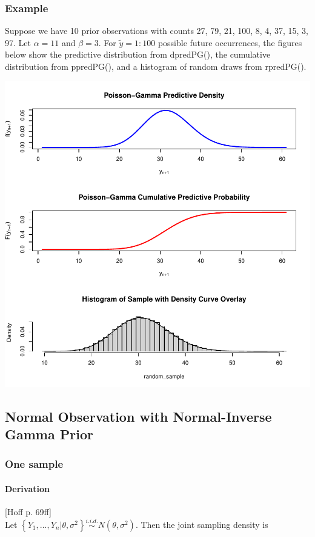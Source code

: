 \documentclass[12pt, a4paper]{article}
\begin{document}
    \subsubsection{Example}

Suppose we have 10 prior observations with counts 27, 79, 21, 100, 8, 4, 37, 15, 3, 97.  Let $\alpha = 11$ and $\beta = 3$.  For $\tilde{y} = 1:100$ possible future occurrences, the figures below show the predictive distribution from dpredPG(), the cumulative distribution from ppredPG(), and a histogram of random draws from rpredPG().

\includegraphics{Thesis-004}

\clearpage

  \subsection{Normal Observation with Normal-Inverse Gamma Prior}
    \subsubsection{One sample}
      \paragraph{Derivation}
      [Hoff p. 69ff]\\
        Let $\left\{Y_1,...,Y_n|\theta,\sigma^2\right\}\overset{i.i.d.}{\sim}N\left(\theta,\sigma^2\right)$.  Then the joint sampling density is
\end{document}

